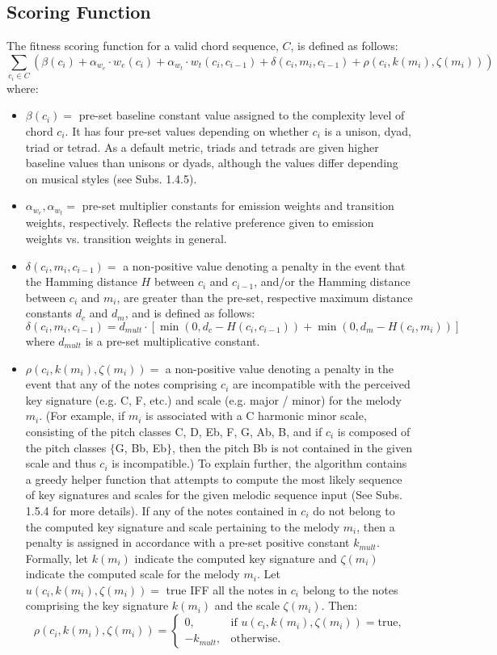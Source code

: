 \documentclass[twoside]{article}
\begin{document}
	\subsection{Scoring Function}
	The fitness scoring function for a valid chord sequence, $C$, is defined as follows:
	$$\sum_{c_i \in C} \left(\beta(c_i) +  \alpha_{w_e} \cdot w_e(c_i) + \alpha_{w_t} \cdot w_t(c_i, c_{i-1}) + \delta(c_i, m_i, c_{i-1}) + \rho(c_i, k(m_i), \zeta(m_i))\right)$$
	where:
	\begin{itemize}
		\item
		$\beta(c_i) = $ pre-set baseline constant value assigned to the complexity level of chord $c_i$. It has four pre-set values depending on whether $c_i$ is a unison, dyad, triad or tetrad. As a default metric, triads and tetrads are given higher baseline values than unisons or dyads, although the values differ depending on musical styles (see Subs. 1.4.5).
		\item 
		$\alpha_{w_e}, \alpha_{w_t} = $ pre-set multiplier constants for emission weights and transition weights, respectively. Reflects the relative preference given to emission weights vs. transition weights in general.
		\item
		$\delta(c_i, m_i, c_{i-1}) = $ a non-positive value denoting a penalty in the event that the Hamming distance $H$ between $c_i$ and $c_{i-1}$, and/or the Hamming distance between $c_i$ and $m_i$, are greater than the pre-set, respective maximum distance constants $d_c$ and $d_m$, and is defined as follows:
		$$\delta(c_i, m_i, c_{i-1}) = d_{mult} \cdot [\min(0, d_c - H(c_i, c_{i-1})) + \min(0, d_m - H(c_i, m_i))]$$
		where $d_{mult}$ is a pre-set multiplicative constant.
		\item 
		$\rho(c_i, k(m_i), \zeta(m_i)) = $ a non-positive value denoting a penalty in the event that any of the notes comprising $c_i$ are incompatible with the perceived key signature (e.g. C, F, etc.) and scale (e.g. major / minor) for the melody $m_i$. (For example, if $m_i$ is associated with a C harmonic minor scale, consisting of the pitch classes C, D, Eb, F, G, Ab, B, and if $c_i$ is composed of the pitch classes $\{$G, Bb, Eb$\}$, then the pitch Bb is not contained in the given scale and thus $c_i$ is incompatible.) To explain further, the algorithm contains a greedy helper function that attempts to compute the most likely sequence of key signatures and scales for the given melodic sequence input (See Subs. 1.5.4 for more details). If any of the notes contained in $c_i$ do not belong to the computed key signature and scale pertaining to the melody $m_i$, then a penalty is assigned in accordance with a pre-set positive constant $k_{mult}$. Formally, let $k(m_i)$ indicate the computed key signature and $\zeta(m_i)$ indicate the computed scale for the melody $m_i$. Let $u(c_i, k(m_i), \zeta(m_i)) = $ true IFF all the notes in $c_i$ belong to the notes comprising the key signature $k(m_i)$ and the scale $\zeta(m_i)$. Then:
		$$\rho(c_i, k(m_i), \zeta(m_i)) = 
		\begin{cases}
		0, 			 & \text{if } u(c_i, k(m_i), \zeta(m_i)) = \text{true,}\\
		-k_{mult},& \text{otherwise.}
		\end{cases}$$
	\end{itemize}
\end{document}
